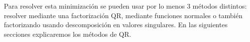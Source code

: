 Para resolver esta minimización se pueden usar por lo menos 3 métodos distintos: resolver mediante una factorización QR, mediante funciones normales o también factorizando usando descomposición en valores singulares. En las siguientes secciones explicaremos los métodos de QR.


%
%
